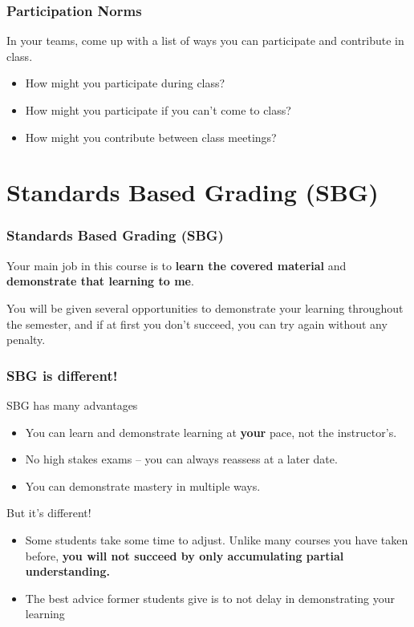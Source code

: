 \documentclass[aspectratio=1610]{beamer}
\begin{document}
\begin{frame}\frametitle{Participation Norms}

In your teams, come up with a list of ways you can participate and contribute in class.
\vfill
\begin{itemize}
\item How might you participate during class?
\item How might you participate if you can't come to class? 
\item How might you contribute between class meetings?
\end{itemize}
\end{frame}

\section{Standards Based Grading (SBG)}
%
%



\begin{frame}\frametitle{Standards Based Grading (SBG)}
Your main job in this course is to \textbf{learn the covered material}
and \textbf{demonstrate that learning to me}.

\vspace{0.2in}
\pause

You will be given several opportunities to demonstrate your learning throughout
the semester, and if
at first you don't succeed, you can try again without any penalty.
\end{frame}

\begin{frame}\frametitle{SBG is different!}
SBG has many advantages
\begin{itemize}
\item You can learn and demonstrate learning at \textbf{your} pace, not the instructor's.
\item No high stakes exams -- you can always reassess at a later date.
\item You can demonstrate mastery in multiple ways.
\end{itemize}
\vfill
But it's different!
\begin{itemize}
\item Some students take some time to adjust.  Unlike many courses you have taken before, \textbf{you will not succeed by only accumulating partial understanding.}
\item The best advice former students give is to not delay in demonstrating your learning
\end{itemize}
\end{frame}
\end{document}

